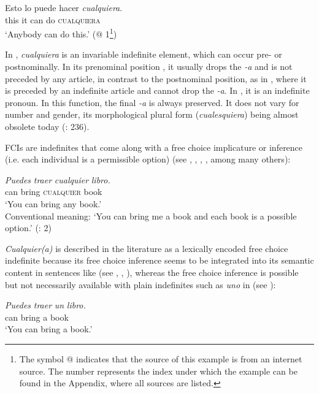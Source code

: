 \ea \label{ex:key:2}
    \gll Esto lo puede hacer \textit{cualquiera}.\\
     this it can do \textsc{cualquiera}\\
    \glt ‘Anybody can do this.’ (@ 1\footnote{{The symbol @ indicates that the source of this example is from an internet source. The number represents the index under which the example can be found in the Appendix, where all sources are listed.}})
\z


In , \textit{cualquiera} is an invariable indefinite element, which can occur pre- or postnominally. In its prenominal position , it usually drops the \textit{{}-a} and is not preceded by any article, in contrast to the postnominal position, as in , where it is preceded by an indefinite article and cannot drop the \textit{{}-a}. In , it is an indefinite pronoun. In this function, the final \textit{{}-a} is always preserved. It does not vary for number and gender, its morphological plural form (\textit{cualesquiera}) being almost obsolete today (\citealt{DeBruyne2011}: 236).

FCIs are indefinites that come along with a free choice implicature or inference (i.e. each individual is a permissible option) (see \citealt{Arregui2006}, \citealt{AloniPort2013}, \citealt{Aloni2021}, \citealt{Alonso-OvalleMenéndez-Benito2011,am2018}, among many others):

\ea \label{ex:key:3}
    \gll \textit{Puedes} \textit{traer} \textit{cualquier} \textit{libro.}\\
    can bring \textsc{cualquier} book\\
    \glt ‘You can bring any book.’\\
    Conventional meaning: ‘You can bring me a book and each book is a possible option.’
    (\citealt{AloniEtAl2011}: 2)
\z

\textit{Cualquier(a)} is described in the literature as a lexically encoded free choice indefinite because its free choice inference seems to be integrated into its semantic content in sentences like  (see \citealt{AloniPort2013}, \citealt{Aloni2021}, \citealt{Alonso-OvalleMenéndez-Benito2011,am2018}), whereas the free choice inference is possible but not necessarily available with plain indefinites such as \textit{uno} in  (see \citealt{Aloni2021}):

\ea \label{ex:key:4}
    \gll \textit{Puedes} \textit{traer} \textit{un} \textit{libro.}\\
    can bring a book\\
    \glt ‘You can bring a book.’\\

